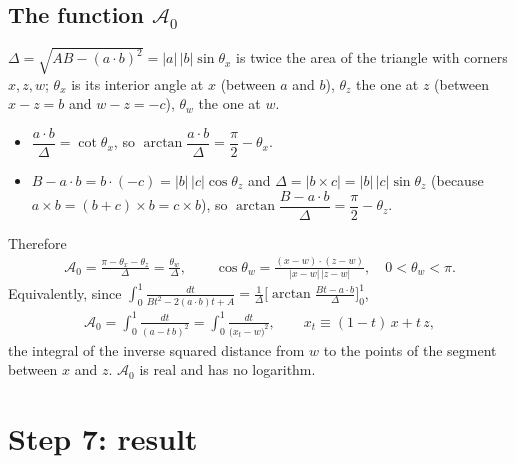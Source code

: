 \documentclass[10pt]{article}
\numberwithin{equation}{section}
\begin{document}
\subsection{The function $\mathcal{A}_{0}$}
$\Delta=\sqrt{AB-(a\cdot b)^{2}}=|a|\,|b|\sin\theta_{x}$ is twice the area of the triangle with corners $x,z,w$; $\theta_{x}$ is its interior angle at $x$ (between $a$ and $b$), $\theta_{z}$ the one at $z$ (between $x-z=b$ and $w-z=-c$), $\theta_{w}$ the one at $w$.
\begin{itemize}
\item $\dfrac{a\cdot b}{\Delta}=\cot\theta_{x}$, so $\arctan\dfrac{a\cdot b}{\Delta}=\dfrac{\pi}{2}-\theta_{x}$.
\item $B-a\cdot b=b\cdot(-c)=|b|\,|c|\cos\theta_{z}$ and $\Delta=|b\times c|=|b|\,|c|\sin\theta_{z}$ (because $a\times b=(b+c)\times b=c\times b$), so $\arctan\dfrac{B-a\cdot b}{\Delta}=\dfrac{\pi}{2}-\theta_{z}$.
\end{itemize}
Therefore
\begin{align}
\mathcal{A}_{0}=\frac{\pi-\theta_{x}-\theta_{z}}{\Delta}=\frac{\theta_{w}}{\Delta},\qquad
\cos\theta_{w}=\frac{(x-w)\cdot(z-w)}{|x-w|\,|z-w|},\quad0<\theta_{w}<\pi. \label{eq:A0}
\end{align}
Equivalently, since $\int_{0}^{1}\frac{dt}{Bt^{2}-2(a\cdot b)t+A}=\frac{1}{\Delta}\Big[\arctan\frac{Bt-a\cdot b}{\Delta}\Big]_{0}^{1}$,
\begin{align}
\mathcal{A}_{0}=\int_{0}^{1}\frac{dt}{(a-t\,b)^{2}}=\int_{0}^{1}\frac{dt}{\big(x_{t}-w\big)^{2}},\qquad x_{t}\equiv(1-t)\,x+t\,z, \label{eq:A0int}
\end{align}
the integral of the inverse squared distance from $w$ to the points of the segment between $x$ and $z$. $\mathcal{A}_{0}$ is real and has no logarithm.

\section{Step 7: result}
\end{document}
